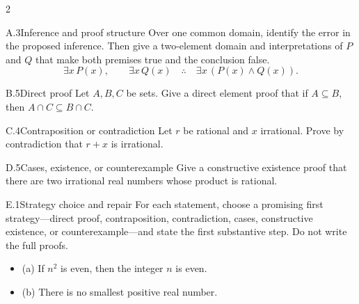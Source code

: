 \documentclass[9pt]{extarticle}
\begin{document}
\begin{multicols}{2}
\begin{CoreProblem}{A.3}{Inference and proof structure}
Over one common domain, identify the error in the proposed inference. Then give
a two-element domain and interpretations of $P$ and $Q$ that make both premises
true and the conclusion false.
\[
\exists x\,P(x),\qquad \exists x\,Q(x)
\quad\therefore\quad
\exists x\,(P(x)\land Q(x)).
\]
\end{CoreProblem}
\begin{CoreProblem}{B.5}{Direct proof}
Let $A,B,C$ be sets. Give a direct element proof that if $A\subseteq B$, then
$A\cap C\subseteq B\cap C$.
\end{CoreProblem}
\begin{CoreProblem}{C.4}{Contraposition or contradiction}
Let $r$ be rational and $x$ irrational. Prove by contradiction that $r+x$ is irrational.
\end{CoreProblem}
\columnbreak
\begin{CoreProblem}{D.5}{Cases, existence, or counterexample}
Give a constructive existence proof that there are two irrational real numbers
whose product is rational.
\end{CoreProblem}
\begin{CoreProblem}{E.1}{Strategy choice and repair}
For each statement, choose a promising first strategy---direct proof,
contraposition, contradiction, cases, constructive existence, or
counterexample---and state the first substantive step. Do not write the full
proofs.
\begin{itemize}
  \item (a) If $n^2$ is even, then the integer $n$ is even.
  \item (b) There is no smallest positive real number.
\end{itemize}
\end{CoreProblem}
\end{multicols}
\CoreWorkArea
\FormBreak
{}
\end{document}

